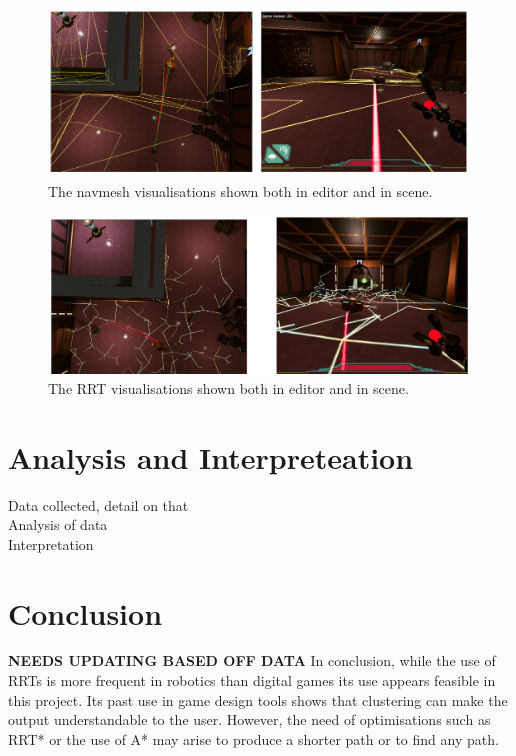 \documentclass[journal]{IEEEtran}
\begin{document}
\begin{figure}[h]
	\includegraphics[width=1.0\linewidth]{NavmeshVis.png}
	\caption{The navmesh visualisations shown both in editor and in scene.}
	\label{image:navmeshVisuals}
\end{figure}  


\begin{figure}[h]
	\includegraphics[width=1.0\linewidth]{RRTVis.png}
	\caption{The RRT visualisations shown both in editor and in scene.}
	\label{image:RRTVisuals}
\end{figure}  

\section{Analysis and Interpreteation}
Data collected, detail on that \\
Analysis of data \\
Interpretation 

\section{Conclusion} \textbf{NEEDS UPDATING BASED OFF DATA}
In conclusion, while the use of RRTs is more frequent in robotics than digital games its use appears feasible in this project. Its past use in game design tools shows that clustering can make the output understandable to the user. However, the need of optimisations such as RRT* or the use of A* may arise to produce a shorter path or to find any path. 
\end{document}
